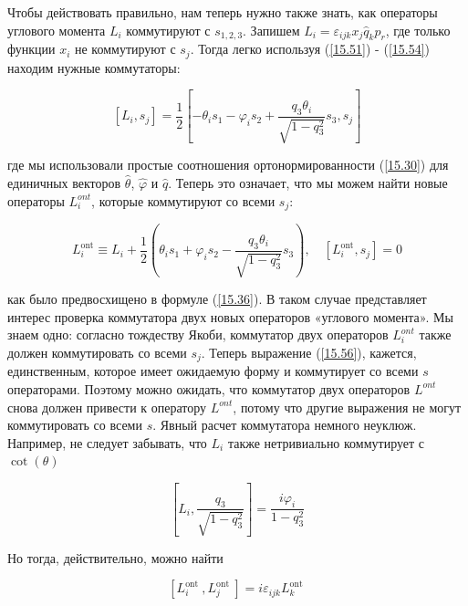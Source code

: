 \documentclass[main.tex]{subfiles}
\begin{document}
Чтобы действовать правильно, нам теперь нужно также знать, как операторы углового момента $L_i$ коммутируют с $s_{1, 2, 3}$. Запишем $L_i = \varepsilon_{ijk} x_j \hat q_k p_r$, где только функции $x_i$ не коммутируют с $s_j$. Тогда легко используя (\ref{15.51}) - (\ref{15.54}) находим нужные коммутаторы:

\begin{equation}\label{15.55}
	\left[L_{i}, s_{j}\right]=\frac{1}{2}\left[-\theta_{i} s_{1}-\varphi_{i} s_{2}+\frac{q_{3} \theta_{i}}{\sqrt{1-q_{3}^{2}}} s_{3}, s_{j}\right]
\end{equation}

где мы использовали простые соотношения ортонормированности (\ref{15.30}) для единичных векторов $\hat \theta$, $\hat \varphi$ и $\hat q$. Теперь это означает, что мы можем найти новые операторы $L_i^{ont}$, которые коммутируют со всеми $s_j$:

\begin{equation}\label{15.56}
	L_{i}^{\mathrm{ont}} \equiv L_{i}+\frac{1}{2}\left(\theta_{i} s_{1}+\varphi_{i} s_{2}-\frac{q_{3} \theta_{i}}{\sqrt{1-q_{3}^{2}}} s_{3}\right), \quad\left[L_{i}^{\mathrm{ont}}, s_{j}\right]=0
\end{equation}

как было предвосхищено в формуле (\ref{15.36}). В таком случае представляет интерес проверка коммутатора двух новых операторов «углового момента». Мы знаем одно: согласно тождеству Якоби, коммутатор двух операторов $L_i^{ont}$ также должен коммутировать со всеми $s_j$. Теперь выражение (\ref{15.56}), кажется, единственным, которое имеет ожидаемую форму и коммутирует со всеми $s$ операторами. Поэтому можно ожидать, что коммутатор двух операторов $L^{ont}$ снова должен привести к оператору $L^{ont}$, потому что другие выражения не могут коммутировать со всеми $s$. Явный расчет
коммутатора немного неуклюж. Например, не следует забывать, что $L_i$ также нетривиально коммутирует с  $\cot(\theta)$

\begin{equation}\label{15.57}
	\left[L_{i}, \frac{q_{3}}{\sqrt{1-q_{3}^{2}}}\right]=\frac{i \varphi_{i}}{1-q_{3}^{2}}
\end{equation}

Но тогда, действительно, можно найти

\begin{equation}\label{15.58}
	\left[L_{i}^{\text {ont }}, L_{j}^{\text {ont }}\right]=i \varepsilon_{i j k} L_{k}^{\text {ont }}
\end{equation}
\end{document}
